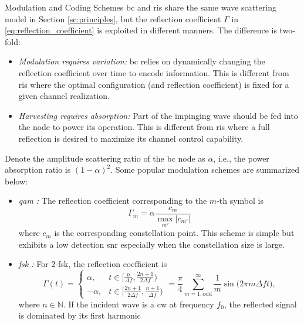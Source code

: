\begin{section}{}
	\begin{subsection}{Modulation and Coding Schemes}
		\gls{bc} and \gls{ris} share the same wave scattering model in Section \ref{sc:principles}, but the reflection coefficient $\Gamma$ in \eqref{eq:reflection_coefficient} is exploited in different manners.
		The difference is two-fold:
		\begin{itemize}
			\item \emph{Modulation requires variation:} \gls{bc} relies on dynamically changing the reflection coefficient over time to encode information. This is different from \gls{ris} where the optimal configuration (and reflection coefficient) is fixed for a given channel realization.
			\item \emph{Harvesting requires absorption:} Part of the impinging wave should be fed into the node to power its operation. This is different from \gls{ris} where a full reflection is desired to maximize its channel control capability.
		\end{itemize}
		Denote the amplitude scattering ratio of the \gls{bc} node as $\alpha$, i.e., the power absorption ratio is $(1-\alpha)^2$. Some popular modulation schemes are summarized below:
		\begin{itemize}
			\item \emph{\gls{qam} \cite{Thomas2012a}:} The reflection coefficient corresponding to the $m$-th symbol is
			\begin{equation}
				\Gamma_m = \alpha \frac{c_m}{\max_{m'} \lvert c_{m'} \rvert}
			\end{equation}
			where $c_m$ is the corresponding constellation point.
			This scheme is simple but exhibits a low detection \gls{snr} especially when the constellation size is large.
			\item \emph{\gls{fsk} \cite{Abbasi2021a}:} For 2-\gls{fsk}, the reflection coefficient is
			\begin{equation}
				\Gamma(t) =
				\begin{cases}
					\alpha, & t \in \bigl[\frac{n}{\Delta f},\frac{2n+1}{2 \Delta f}\bigr) \\
					-\alpha, & t \in \bigl[\frac{2n+1}{2 \Delta f},\frac{n+1}{\Delta f}\bigr)
				\end{cases}
				= \frac{\pi}{4} \sum_{m=1,\text{odd}}^\infty \frac{1}{m} \sin\bigl(2\pi m \Delta f t\bigr),
			\end{equation}
			where $n \in \mathbb{N}$.
			If the incident wave is a \gls{cw} at frequency $f_0$, the reflected signal is dominated by its first harmonic

\end{itemize}
\end{subsection}
\end{section}
